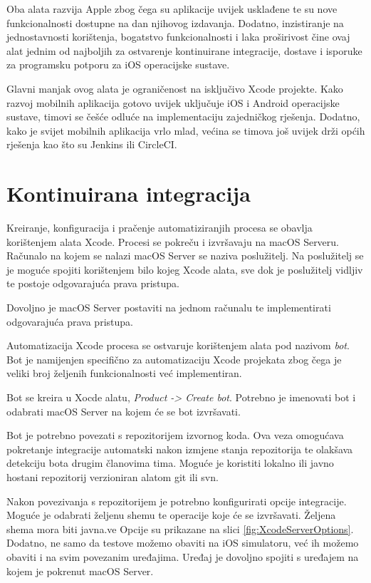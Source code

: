 \documentclass[times, utf8, diplomski, numeric]{fer}
\begin{document}
\begin{appendices}
Oba alata razvija Apple zbog čega su aplikacije uvijek usklađene te su nove funkcionalnosti dostupne na dan njihovog izdavanja. Dodatno, inzistiranje na jednostavnosti korištenja, bogatstvo funkcionalnosti i laka proširivost čine ovaj alat jednim od najboljih za ostvarenje kontinuirane integracije, dostave i isporuke za programsku potporu za iOS operacijske sustave.

Glavni manjak ovog alata je ograničenost na isključivo Xcode projekte. Kako razvoj mobilnih aplikacija gotovo uvijek uključuje iOS i Android operacijske sustave, timovi se češće odluće na implementaciju zajedničkog rješenja. Dodatno, kako je svijet mobilnih aplikacija vrlo mlad, većina se timova još uvijek drži općih rješenja kao što su Jenkins ili CircleCI.

\section{Kontinuirana integracija}

Kreiranje, konfiguracija i pračenje automatiziranjih procesa se obavlja korištenjem alata Xcode. Procesi se pokreču i izvršavaju na macOS Serveru. Računalo na kojem se nalazi macOS Server se naziva poslužitelj. Na poslužitelj se je moguće spojiti korištenjem bilo kojeg Xcode alata, sve dok je poslužitelj vidljiv te postoje odgovarajuća prava pristupa.

Dovoljno je macOS Server postaviti na jednom računalu te implementirati odgovarajuća prava pristupa.

Automatizacija Xcode procesa se ostvaruje korištenjem alata pod nazivom \textit{bot}. Bot je namijenjen specifično za automatizaciju Xcode projekata zbog čega je veliki broj željenih funkcionalnosti već implementiran.

Bot se kreira u Xocde alatu, \textit{Product -> Create bot}. Potrebno je imenovati bot i odabrati macOS Server na kojem će se bot izvršavati.

Bot je potrebno povezati s repozitorijem izvornog koda. Ova veza omogućava pokretanje integracije automatski nakon izmjene stanja repozitorija te olakšava detekciju bota drugim članovima tima. Moguće je koristiti lokalno ili javno hostani repozitorij verzioniran alatom git ili svn.

Nakon povezivanja s repozitorijem je potrebno konfigurirati opcije integracije. Moguće je odabrati željenu shemu te operacije koje će se izvršavati. Željena shema mora biti javna.ve Opcije su prikazane na slici \ref{fig:XcodeServerOptions}. Dodatno, ne samo da testove možemo obaviti na iOS simulatoru, već ih možemo obaviti i na svim povezanim uređajima. Uređaj je dovoljno spojiti s uređajem na kojem je pokrenut macOS Server.


\end{appendices}
\end{document}
